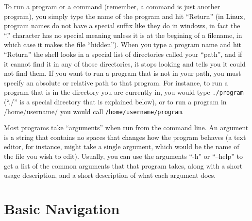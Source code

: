 \documentclass[12pt,letterpaper,oneside, openany]{book} \usepackage[latin1] {inputenc}
\begin{document}
To run a program or a command (remember, a command is just another program), you simply type the name of the program and hit ``Return'' (in Linux, program names do not have a special suffix like they do in windows, in fact the ``.'' character has no special meaning unless it is at the begining of a filename, in which case it makes the file ``hidden'').  When you type a program name and hit ``Return'' the shell looks in a special list of directories called your ``path'', and if it cannot find it in any of those directories, it stops looking and tells you it could not find them.  If you want to run a program that is not in your path, you must specify an absolute or relative path to that program.  For instance, to run a program that is in the directory you are currently in, you would type \verb+./program+ (``./'' is a special directory that is explained below), or to run a program in /home/username/ you would call \verb+/home/username/program+.

Most programs take ``arguments'' when run from the command line.  An argument is a string that contains no spaces that changes how the program behaves (a text editor, for instance, might take a single argument, which would be the name of the file you wish to edit).  Usually, you can use the arguments ``-h'' or ``--help'' to get a list of the common arguments that that program takes, along with a short usage description, and a short description of what each argument does.

\section{Basic Navigation}
\end{document}
